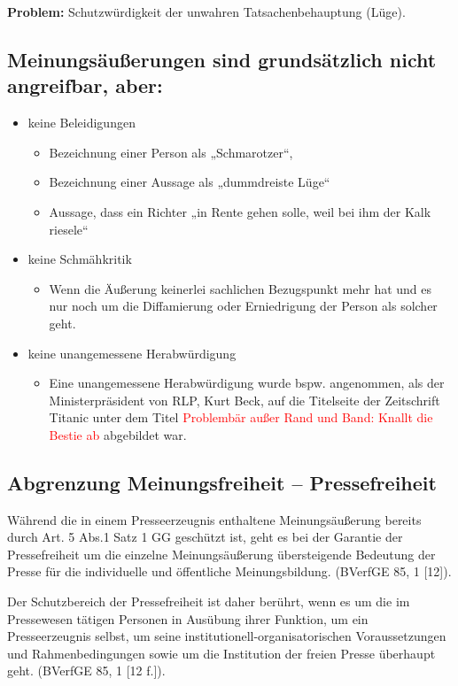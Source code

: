 \textbf{Problem:} Schutzwürdigkeit der unwahren Tatsachenbehauptung (Lüge). \\

\subsection{Meinungsäußerungen sind grundsätzlich nicht angreifbar, aber:}
\begin{itemize}
    \item keine Beleidigungen
    \begin{itemize}
        \item Bezeichnung einer Person als „Schmarotzer“,
        \item Bezeichnung einer Aussage als „dummdreiste Lüge“
        \item Aussage, dass ein Richter „in Rente gehen solle, weil bei ihm der Kalk riesele“
    \end{itemize}
    \item keine Schmähkritik
    \begin{itemize}
        \item Wenn die Äußerung keinerlei sachlichen Bezugspunkt mehr hat und es nur noch um die Diffamierung oder Erniedrigung der Person als solcher geht.
    \end{itemize}
    \item keine unangemessene Herabwürdigung
        \begin{itemize}
            \item Eine unangemessene Herabwürdigung wurde bspw. angenommen, als der Ministerpräsident von RLP, Kurt Beck,
auf die Titelseite der Zeitschrift \glqq{}Titanic\grqq{} unter dem Titel \textcolor{red}{\glqq{}Problembär außer Rand und Band: Knallt die Bestie ab\grqq{}} abgebildet war.
        \end{itemize}
\end{itemize}
%
%
%
\subsection{Abgrenzung Meinungsfreiheit – Pressefreiheit}
\glqq{}Während die in einem Presseerzeugnis enthaltene Meinungsäußerung bereits durch Art. 5 Abs.1 Satz 1 GG geschützt ist, geht es bei der Garantie der Pressefreiheit um die einzelne Meinungsäußerung übersteigende Bedeutung der Presse für die individuelle und öffentliche Meinungsbildung.\grqq{}
(BVerfGE 85, 1 [12]).

\glqq{}Der Schutzbereich der Pressefreiheit ist daher berührt, wenn es um die im Pressewesen tätigen Personen in
Ausübung ihrer Funktion, um ein Presseerzeugnis selbst, um seine institutionell-organisatorischen Voraussetzungen und Rahmenbedingungen sowie um die Institution der freien Presse überhaupt geht.\grqq{}
(BVerfGE 85, 1 [12 f.]).
%
%
%

